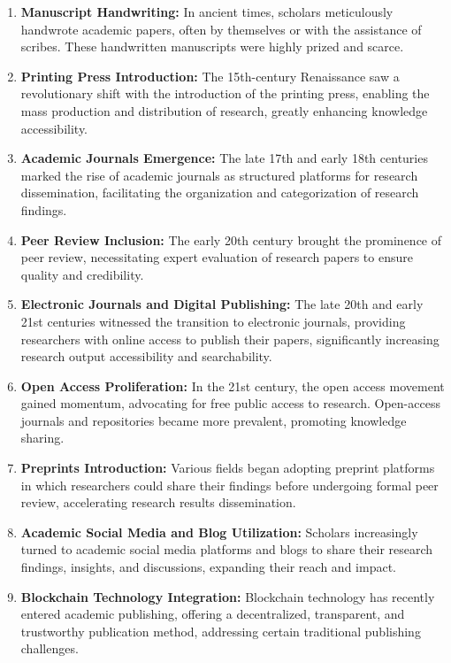 \documentclass[lettersize,journal]{IEEEtran}
\begin{document}
\begin{enumerate}
  \item \textbf{Manuscript Handwriting:} In ancient times, scholars meticulously handwrote academic papers, often by themselves or with the assistance of scribes. These handwritten manuscripts were highly prized and scarce.

  \item \textbf{Printing Press Introduction:} The 15th-century Renaissance saw a revolutionary shift with the introduction of the printing press, enabling the mass production and distribution of research, greatly enhancing knowledge accessibility.

  \item \textbf{Academic Journals Emergence:} The late 17th and early 18th centuries marked the rise of academic journals as structured platforms for research dissemination, facilitating the organization and categorization of research findings.

  \item \textbf{Peer Review Inclusion:} The early 20th century brought the prominence of peer review, necessitating expert evaluation of research papers to ensure quality and credibility.

  \item \textbf{Electronic Journals and Digital Publishing:} The late 20th and early 21st centuries witnessed the transition to electronic journals, providing researchers with online access to publish their papers, significantly increasing research output accessibility and searchability.

  \item \textbf{Open Access Proliferation:} In the 21st century, the open access movement gained momentum, advocating for free public access to research. Open-access journals and repositories became more prevalent, promoting knowledge sharing.

  \item \textbf{Preprints Introduction:} Various fields began adopting preprint platforms in which researchers could share their findings before undergoing formal peer review, accelerating research results dissemination.

  \item \textbf{Academic Social Media and Blog Utilization:} Scholars increasingly turned to academic social media platforms and blogs to share their research findings, insights, and discussions, expanding their reach and impact.

  \item \textbf{Blockchain Technology Integration:} Blockchain technology has recently entered academic publishing, offering a decentralized, transparent, and trustworthy publication method, addressing certain traditional publishing challenges.
\end{enumerate}
\end{document}
